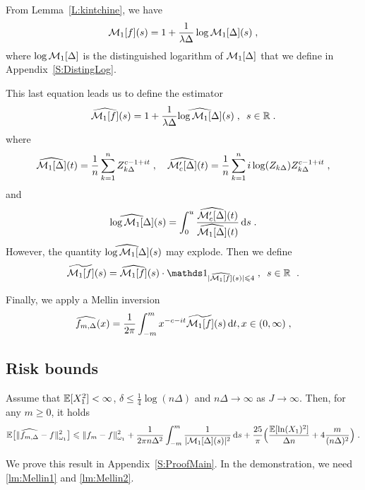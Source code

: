 From Lemma~\ref{L:kintchine}, we have
    \begin{equation*}
        \mathcal{M}_1[f](s) = 1 + \frac{1}{\lambda \Delta} \log \mathcal{M}_1[\Delta](s)
        \; ,
    \end{equation*}
where $ \log \mathcal{M}_1[\Delta]$ is the distinguished logarithm of $\mathcal{M}_1[\Delta]$ that we define in Appendix~\ref{S:DistingLog}. 

This last equation leads us to define the estimator
    \begin{equation*}
        \widehat{\mathcal{M}_1[f]}(s) =  1 + \frac{1}{\lambda \Delta} \widehat{\log \mathcal{M}_1[\Delta]}(s)
        \; , \enspace
        s \in \mathbb{R}
        \; .
    \end{equation*}
where
    \begin{equation*}
        \widehat{\mathcal{M}_1[\Delta]}(t) = \frac{1}{n} \sum_{k = 1}^{n} Z_{k\Delta}^{c - 1 + it}
        \; ,  \quad
        \widehat{\mathcal{M}'_c[\Delta]}(t) = \frac{1}{n} \sum_{k = 1}^{n} i \log(Z_{k\Delta}) Z_{k\Delta}^{c - 1 + it} 
        \; ,
    \end{equation*}
    and 
    \begin{equation*}
        \widehat{\log \mathcal{M}_1[\Delta]}(s) = \int_0^u \frac{\widehat{\mathcal{M}'_c[\Delta]}(t)}{ \widehat{\mathcal{M}_1[\Delta]}(t)} \,\mathrm{d} s
        \; .
    \end{equation*}
However, the quantity $\widehat{\log \mathcal{M}_1[\Delta]}(s)$ may explode. Then we define 
    \begin{equation*}
        \tilde{\Mcal_1[f]}(s) =  \hat{\Mcal_1[f]}(s) \cdot \ind{| \hat{\Mcal_1[f]}(s)| \leq 4}
        \eqsepv
        s \in \RR  \
        \eqfinp
    \end{equation*}

Finally, we apply a Mellin inversion
    \begin{equation}
    \widehat{f_{m, \Delta}}(x) = \frac{1}{2\pi} \int_{-m}^m x^{-c - it} \widetilde{\mathcal{M}_1[f]}(s) \,\mathrm{d} t, 
    x \in (0, \infty)
    \; ,
    \end{equation}

\subsection{Risk bounds}
\label{sec:risk_mellin}
\begin{theorem} 
\label{T:risk}
Assume that $\mathbb{E}[X_1^2] < \infty$, $\delta \leq \frac{1}{4} \log(n\Delta)$ and $n\Delta \to \infty$ as $J \to \infty$. Then, for any $m \geq 0$, it holds
\begin{equation}
    \mathbb{E} \big[ \|\widehat{f_{m, \Delta}}  - f \|_{\omega_1}^2\big] \leqslant \|f_m  - f \|_{\omega_1}^2 
    +
    \frac{1}{2\pi n \Delta^2} \int_{-m}^{m}\frac{1}{|\mathcal{M}_1[\Delta](s)|^2}\,\mathrm{d} s 
    + \frac{25}{\pi} \Big(\frac{\mathbb{E}[\ln(X_1)^2]}{\Delta n} + 4 \frac{m}{(n \Delta)^{2}} \Big)
    \; .
\end{equation}
\end{theorem} 
We prove this result in Appendix~\ref{S:ProofMain}. In the demonstration, we need \cref{lm:Mellin1} and \cref{lm:Mellin2}. 

